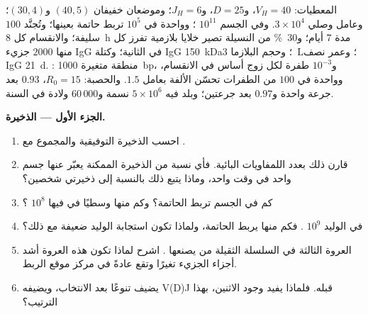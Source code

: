 \begin{problem}
\label{pb:b3:adaptive-immunity:1}
المعطيات: $V_{H} = 40$، و$D = 25$، و$J_{H} = 6$؛ وموضعان
خفيفان $(40, 5)$ و$(30, 4)$؛ وعامل وصلي $3\times 10^{4}$. وفي
الجسم $10^{11}$ ؛ وواحدة في $10^{5}$ تربط حاتمة
بعينها؛ وتُجنَّد $100$ سليفة؛ والانقسام كل \qty{8}{h} مدة
$7$ أيام؛ و\qty{30}{\%} من النسيلة تصير خلايا بلازمية تفرز
كل منها $2000$ جزيء IgG في الثانية؛ وكتلة IgG
\qty{150}{kDa}؛ وحجم البلازما \qty{3}{L}؛ وعمر نصف IgG
\qty{21}{d}. : منطقة متغيرة \qty{1000}{bp}،
و$10^{-3}$ طفرة لكل زوج أساس في الانقسام، وواحدة في $100$
من الطفرات تحسّن الألفة بعامل $1.5$. والحصبة: $R_{0} = 15$،
 $0.93$ بعد جرعة واحدة و$0.97$ بعد جرعتين؛
وبلد فيه $5\times 10^{6}$ نسمة و$60\,000$ ولادة في السنة.

\medskip
\noindent\textbf{الجزء الأول --- الذخيرة.}
\begin{enumerate}
  \item احسب الذخيرة التوفيقية والمجموع مع .
  \item قارن ذلك بعدد اللمفاويات البائية. فأي نسبة من
        الذخيرة الممكنة يعبّر عنها جسم واحد في وقت واحد،
        وماذا يتبع ذلك بالنسبة إلى ذخيرتي شخصين؟
  \item كم  في الجسم تربط الحاتمة؟ وكم منها
        وسطيًا في  فيها $10^{8}$ ؟
  \item في الوليد $10^{9}$ . فكم منها يربط
        الحاتمة، ولماذا تكون استجابة الوليد ضعيفة مع ذلك؟
  \item العروة الثالثة في السلسلة الثقيلة من  يصنعها
        . اشرح لماذا تكون هذه العروة أشد أجزاء
        الجزيء تغيرًا وتقع عادةً في مركز موقع الربط.
  \item يضيف  تنوعًا بعد الانتخاب،
        ويضيفه V(D)J قبله. فلماذا يفيد وجود الاثنين، بهذا
        الترتيب؟
\end{enumerate}


\end{problem}
